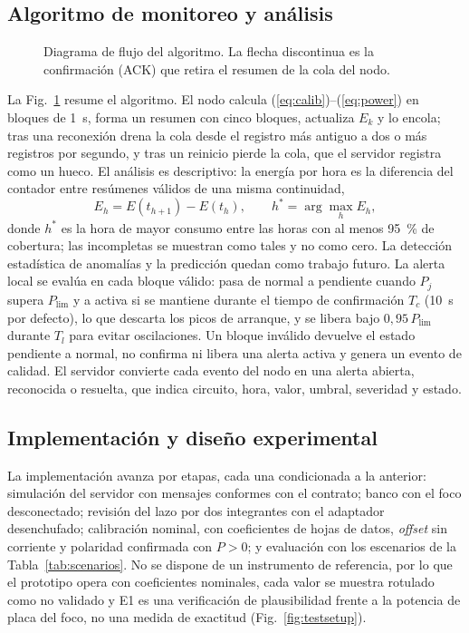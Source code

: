 \subsection{Algoritmo de monitoreo y análisis}
\label{sec:algorithm}
\begin{figure}[t]
  \centering
  
  \caption{Diagrama de flujo del algoritmo. La flecha discontinua es la confirmación (ACK) que retira el resumen de la cola del nodo.}
  \label{fig:algorithm}
\end{figure}

La Fig.~\ref{fig:algorithm} resume el algoritmo.
El nodo calcula (\ref{eq:calib})--(\ref{eq:power}) en bloques de \SI{1}{s}, forma un resumen con cinco bloques, actualiza $E_k$ y lo encola; tras una reconexión drena la cola desde el registro más antiguo a dos o más registros por segundo, y tras un reinicio pierde la cola, que el servidor registra como un hueco.
El análisis es descriptivo: la energía por hora es la diferencia del contador entre resúmenes válidos de una misma continuidad,
\begin{equation}
E_{h}=E(t_{h+1})-E(t_{h}),\qquad h^{*}=\arg\max_{h}E_{h},
\label{eq:hourly}
\end{equation}
donde $h^{*}$ es la hora de mayor consumo entre las horas con al menos \SI{95}{\percent} de cobertura; las incompletas se muestran como tales y no como cero.
La detección estadística de anomalías y la predicción quedan como trabajo futuro.
La alerta local se evalúa en cada bloque válido: pasa de normal a pendiente cuando $P_j$ supera $P_{\mathrm{lim}}$ y a activa si se mantiene durante el tiempo de confirmación $T_c$ (\SI{10}{s} por defecto), lo que descarta los picos de arranque, y se libera bajo $0{,}95\,P_{\mathrm{lim}}$ durante $T_l$ para evitar oscilaciones.
Un bloque inválido devuelve el estado pendiente a normal, no confirma ni libera una alerta activa y genera un evento de calidad.
El servidor convierte cada evento del nodo en una alerta abierta, reconocida o resuelta, que indica circuito, hora, valor, umbral, severidad y estado.

\subsection{Implementación y diseño experimental}
\label{sec:experimental}
La implementación avanza por etapas, cada una condicionada a la anterior: simulación del servidor con mensajes conformes con el contrato; banco con el foco desconectado; revisión del lazo por dos integrantes con el adaptador desenchufado; calibración nominal, con coeficientes de hojas de datos, \textit{offset} sin corriente y polaridad confirmada con $P>0$; y evaluación con los escenarios de la Tabla~\ref{tab:scenarios}.
No se dispone de un instrumento de referencia, por lo que el prototipo opera con coeficientes nominales, cada valor se muestra rotulado como no validado y E1 es una verificación de plausibilidad frente a la potencia de placa del foco, no una medida de exactitud (Fig.~\ref{fig:testsetup}).

